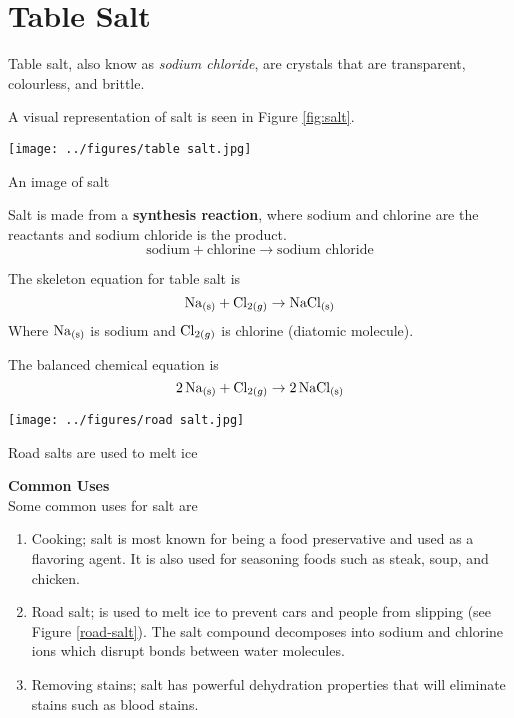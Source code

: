 \documentclass[working]{tuftebook}
\begin{document}
\chapter*{Table Salt}
\vspace{-2em}
Table salt, also know as \emph{sodium chloride}, are crystals that are transparent, colourless, and brittle.

A visual representation of salt is seen in Figure \ref{fig:salt}. 


\begin{marginfigure}
    \centering 
    \texttt{[image: ../figures/table salt.jpg]}
    \caption{An image of salt}
    \label{fig:salt}
\end{marginfigure}

\begin{wordequation}
Salt is made from a \textbf{synthesis reaction}, where sodium and chlorine are the reactants and sodium chloride is the product. 
    \[
        \text{sodium}+ \text{chlorine}\to \text{sodium chloride}
    \]
\end{wordequation}

\begin{skeletonequation}
    The skeleton equation for table salt is 
    \[
        \ce{Na_{(s)}}+ \ce{Cl_{2(g)}}\to \ce{NaCl_{(s)}}
    \]
    Where $\ce{Na_{(s)}}$ is sodium and $\ce{Cl_{2(g)}}$ is chlorine (diatomic molecule).
\end{skeletonequation}

\begin{balancedchemicalequation}
    The balanced chemical equation is 
    \[
        \ce{2Na_{(s)}}+ \ce{Cl_{2(g)}}\to \ce{2NaCl_{(s)}}
    \]
\end{balancedchemicalequation}

\begin{marginfigure}
    \centering
    \texttt{[image: ../figures/road salt.jpg]}
    \caption{Road salts are used to melt ice}
    \label{road-salt}
\end{marginfigure}

\textbf{Common Uses}\\
Some common uses for salt are 
\begin{enumerate}
    \item{Cooking; salt is most known for being a food preservative and used as a flavoring agent. It is also used for seasoning foods such as steak, soup, and chicken.}
    \item{Road salt; is used to melt ice to prevent cars and people from slipping (see Figure \ref{road-salt}). The salt compound decomposes into sodium and chlorine ions which disrupt bonds between water molecules.}
    \item{Removing stains; salt has powerful dehydration properties that will eliminate stains such as blood stains.}
\end{enumerate}
\end{document}
